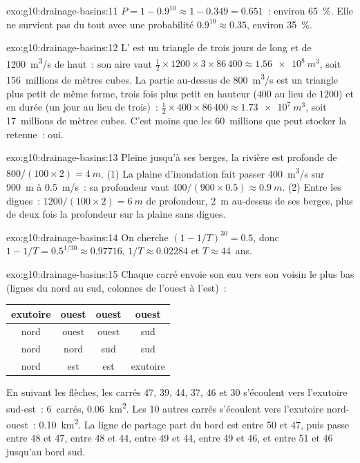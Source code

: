 \begin{solution}{exo:g10:drainage-basins:11}
$P = 1 - 0.9^{10} \approx 1 - 0.349 = 0.651$~: environ \qty{65}{\percent}.
Elle ne survient pas du tout avec une probabilité $0.9^{10} \approx 0.35$,
environ \qty{35}{\percent}.
\end{solution}

\begin{solution}{exo:g10:drainage-basins:12}
L' est un triangle de trois jours de long et de
\qty{1200}{m^3/s} de haut~: son aire vaut $\tfrac12 \times 1200 \times 3 \times 86\,400 \approx
\qty{1.56e8}{m^3}$, soit \num{156}~millions de mètres cubes. La partie
au-dessus de \qty{800}{m^3/s} est un triangle plus petit de même forme,
trois fois plus petit en hauteur ($400$ au lieu de $1200$) et en durée (un
jour au lieu de trois)~: $\tfrac12 \times 400 \times 86\,400 \approx \qty{1.73e7}{m^3}$,
soit \num{17}~millions de mètres cubes. C'est moins que les
\num{60}~millions que peut stocker la retenue~: oui.
\end{solution}

\begin{solution}{exo:g10:drainage-basins:13}
Pleine jusqu'à ses berges, la rivière est profonde de $800/(100 \times 2) = \qty{4}{m}$.
(1) La plaine d'inondation fait passer \qty{400}{m^3/s} sur \qty{900}{m} à
\qty{0.5}{m/s}~: sa profondeur vaut $400/(900 \times 0.5) \approx \qty{0.9}{m}$.
(2) Entre les digues~: $1200/(100 \times 2) = \qty{6}{m}$ de profondeur,
\qty{2}{m} au-dessus de ses berges, plus de deux fois la profondeur sur la
plaine sans digues.
\end{solution}

\begin{solution}{exo:g10:drainage-basins:14}
On cherche $(1 - 1/T)^{30} = 0.5$, donc $1 - 1/T = 0.5^{1/30} \approx 0.97716$,
$1/T \approx 0.02284$ et $T \approx 44$~ans.
\end{solution}

\begin{solution}{exo:g10:drainage-basins:15}
Chaque carré envoie son eau vers son voisin le plus bas (lignes du nord au
sud, colonnes de l'ouest à l'est)~:
\begin{center}
\begin{tabular}{|c|c|c|c|}
\hline
exutoire & ouest & ouest & ouest \\ \hline
nord & ouest & ouest & sud \\ \hline
nord & nord & sud & sud \\ \hline
nord & est & est & exutoire \\ \hline
\end{tabular}
\end{center}
En suivant les flèches, les carrés 47, 39, 44, 37, 46 et 30 s'écoulent vers
l'exutoire sud-est~: 6~carrés, \qty{0.06}{km^2}. Les 10 autres carrés
s'écoulent vers l'exutoire nord-ouest~: \qty{0.10}{km^2}. La ligne de
partage part du bord est entre 50 et 47, puis passe entre 48 et 47, entre
48 et 44, entre 49 et 44, entre 49 et 46, et entre 51 et 46 jusqu'au bord
sud.
\end{solution}


